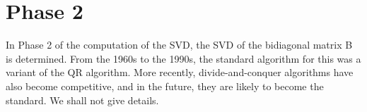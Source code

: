 \section{Phase 2} 

In Phase 2 of the computation of the SVD, the SVD of the bidiagonal matrix B is determined. From the 1960s to the 1990s, the standard algorithm for this was a variant of the QR algorithm. More recently, divide-and-conquer algorithms have also become competitive, and in the future, they are likely to become the standard. We shall not give details.